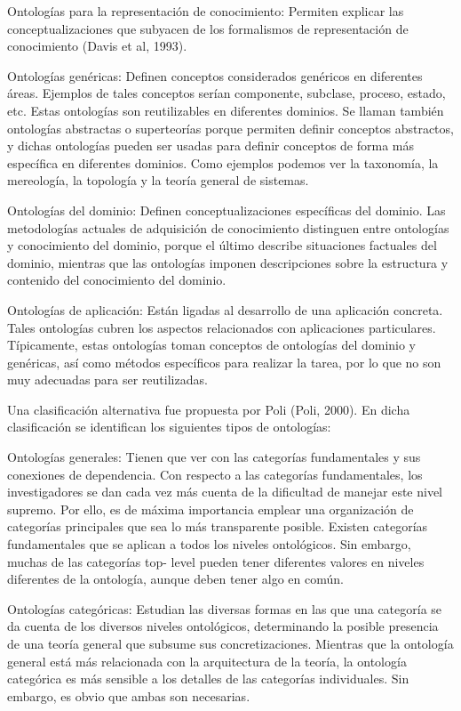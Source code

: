 Ontologías para la representación de conocimiento: Permiten explicar las conceptualizaciones que subyacen de los formalismos de representación de conocimiento (Davis et al, 1993).

Ontologías genéricas: Definen conceptos considerados genéricos en diferentes áreas. Ejemplos de tales conceptos serían componente, subclase, proceso, estado, etc. Estas ontologías son reutilizables en diferentes dominios. Se llaman también ontologías abstractas o superteorías porque permiten definir conceptos abstractos, y dichas ontologías pueden ser usadas para definir conceptos de forma más específica en diferentes dominios. Como ejemplos podemos ver la taxonomía, la mereología, la topología y la teoría general de sistemas.

Ontologías del dominio: Definen conceptualizaciones específicas del dominio. Las metodologías actuales de adquisición de conocimiento distinguen entre ontologías y conocimiento del dominio, porque el último describe situaciones factuales del dominio, mientras que las ontologías imponen descripciones sobre la estructura y contenido del conocimiento del dominio.

Ontologías de aplicación: Están ligadas al desarrollo de una aplicación concreta. Tales ontologías cubren los aspectos relacionados con aplicaciones particulares. Típicamente, estas ontologías toman conceptos de ontologías del dominio y genéricas, así como métodos específicos para realizar la tarea, por lo que no son muy adecuadas para ser reutilizadas.

Una clasificación alternativa fue propuesta por Poli (Poli, 2000). En dicha clasificación se identifican los siguientes tipos de ontologías: 

Ontologías generales: Tienen que ver con las categorías fundamentales y sus conexiones de dependencia. Con respecto a las categorías fundamentales, los investigadores se dan cada vez más cuenta de la dificultad de manejar este nivel supremo. Por ello, es de máxima importancia emplear una organización de categorías principales que sea lo más transparente posible. Existen categorías fundamentales que se aplican a todos los niveles ontológicos. Sin embargo, muchas de las categorías top- level pueden tener diferentes valores en niveles diferentes de la ontología, aunque deben  tener algo en común. 

Ontologías categóricas: Estudian las diversas formas en las que una categoría se da cuenta de los diversos niveles ontológicos, determinando la posible presencia de una teoría general que subsume sus concretizaciones. Mientras que la ontología general está más relacionada con la arquitectura de la teoría, la ontología categórica es más sensible a los detalles de las categorías individuales. Sin embargo, es obvio que ambas son necesarias.

